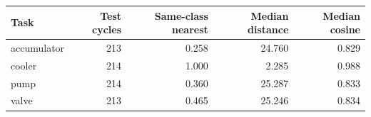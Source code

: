 \begin{tabular}{lrrrr}
\toprule
Task & Test cycles & Same-class nearest & Median distance & Median cosine \\
\midrule
accumulator & 213 & 0.258 & 24.760 & 0.829 \\
cooler & 214 & 1.000 & 2.285 & 0.988 \\
pump & 214 & 0.360 & 25.287 & 0.833 \\
valve & 213 & 0.465 & 25.246 & 0.834 \\
\bottomrule
\end{tabular}